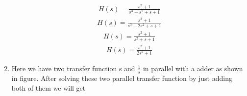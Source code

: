 \begin{enumerate}[label=\thesection.\arabic*.,ref=\thesection.\theenumi]
\begin{figure}
\begin{center}
\begin{tikzpicture}[auto, node distance=2.5cm,>=latex']
        \end{tikzpicture}
    \end{center}
\end{figure}

\begin{align}
 H(s)=\frac{s^2+1}{s^3+s^2+s+1}
\end{align}
\begin{align}
 H(s)=\frac{s^2+1}{s^3+2s^2+s+1}
\end{align}
\begin{align}
 H(s)=\frac{s^2+1}{s^2+s+1}
\end{align}
\begin{align}
 H(s)=\frac{s^2+1}{2s^2+1}
\end{align}



\solution 
\item Here we have two transfer function s and $\frac{1}{s}$ in parallel with a adder as shown in figure.
After solving these two parallel transfer function by just adding both of them we will get




\end{enumerate}
